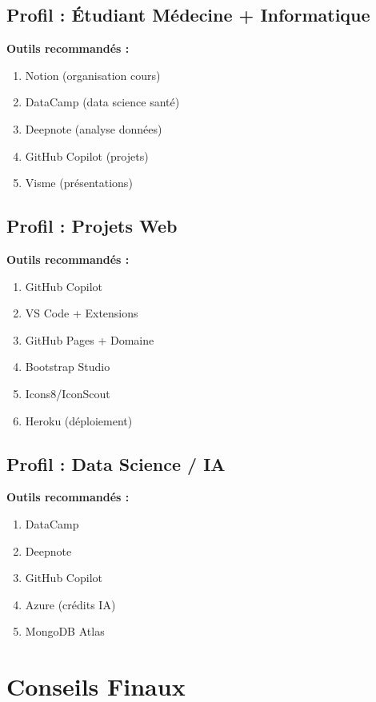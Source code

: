 \documentclass[11pt,a4paper]{article}
\begin{document}
\subsection{Profil : Étudiant Médecine + Informatique}

\textbf{Outils recommandés :}
\begin{enumerate}
    \item Notion (organisation cours)
    \item DataCamp (data science santé)
    \item Deepnote (analyse données)
    \item GitHub Copilot (projets)
    \item Visme (présentations)
\end{enumerate}

\subsection{Profil : Projets Web}

\textbf{Outils recommandés :}
\begin{enumerate}
    \item GitHub Copilot
    \item VS Code + Extensions
    \item GitHub Pages + Domaine
    \item Bootstrap Studio
    \item Icons8/IconScout
    \item Heroku (déploiement)
\end{enumerate}

\subsection{Profil : Data Science / IA}

\textbf{Outils recommandés :}
\begin{enumerate}
    \item DataCamp
    \item Deepnote
    \item GitHub Copilot
    \item Azure (crédits IA)
    \item MongoDB Atlas
\end{enumerate}

\newpage
\section{Conseils Finaux}
\end{document}
